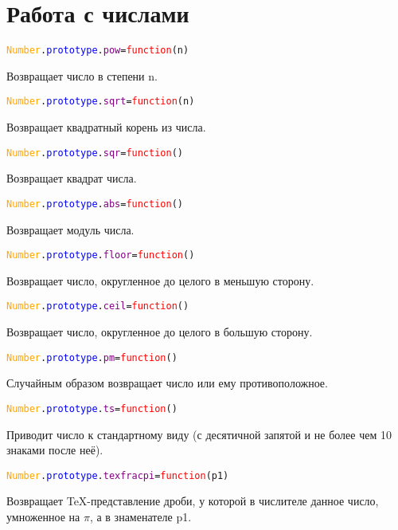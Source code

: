 \documentclass[a4paper,12pt]{article}
\begin{document}
	\section{Работа с числами}
		\begin{alltt}
			\textcolor{Orange}{Number}.\textcolor{Blue}{prototype}.\textcolor{Purple}{pow}=\textcolor{Red}{function}(n)
		\end{alltt}
	Возвращает число в степени n.
		\begin{alltt}
			\textcolor{Orange}{Number}.\textcolor{Blue}{prototype}.\textcolor{Purple}{sqrt}=\textcolor{Red}{function}(n)
		\end{alltt}
	Возвращает квадратный корень из числа.
		\begin{alltt}
			\textcolor{Orange}{Number}.\textcolor{Blue}{prototype}.\textcolor{Purple}{sqr}=\textcolor{Red}{function}()
		\end{alltt}
	Возвращает квадрат числа.
		\begin{alltt}
			\textcolor{Orange}{Number}.\textcolor{Blue}{prototype}.\textcolor{Purple}{abs}=\textcolor{Red}{function}()
		\end{alltt}
	Возвращает модуль числа.
		\begin{alltt}
			\textcolor{Orange}{Number}.\textcolor{Blue}{prototype}.\textcolor{Purple}{floor}=\textcolor{Red}{function}()
		\end{alltt}
	Возвращает число, округленное до целого в меньшую сторону.
		\begin{alltt}
			\textcolor{Orange}{Number}.\textcolor{Blue}{prototype}.\textcolor{Purple}{ceil}=\textcolor{Red}{function}()
		\end{alltt}
	Возвращает число, округленное до целого в большую сторону.
		\begin{alltt}
			\textcolor{Orange}{Number}.\textcolor{Blue}{prototype}.\textcolor{Purple}{pm}=\textcolor{Red}{function}()
		\end{alltt}
	Случайным образом возвращает число или ему противоположное.
		\begin{alltt}
			\textcolor{Orange}{Number}.\textcolor{Blue}{prototype}.\textcolor{Purple}{ts}=\textcolor{Red}{function}()
		\end{alltt}
	Приводит число к стандартному виду (с десятичной запятой и не более чем 10 знаками после неё).
		\begin{alltt}
			\textcolor{Orange}{Number}.\textcolor{Blue}{prototype}.\textcolor{Purple}{texfracpi}=\textcolor{Red}{function}(p1)
		\end{alltt}
	Возвращает TeX-представление дроби, у которой в числителе данное число, умноженное на $\pi$, а в знаменателе p1.
\end{document}
